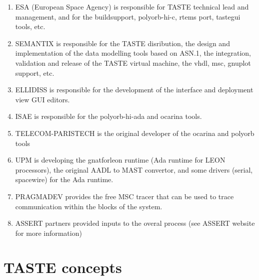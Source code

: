 \documentclass[11pt]{book}
\newcommand{\Concept}[1]{#1\xspace}
\newcommand{\taste}{\Concept{TASTE}}
\begin{document}
\begin{enumerate}
     \item
	ESA (European Space Agency) is responsible for TASTE technical lead and management, and for the buildsupport, polyorb-hi-c, rtems port, tastegui tools, etc.
    \item
	SEMANTIX is responsible for the TASTE disribution, the design and implementation of the data modelling tools based on ASN.1, the integration, validation and release of the TASTE virtual machine, the vhdl, msc, gnuplot support, etc.
    \item
	ELLIDISS is responsible for the development of the interface and deployment view GUI editors.
    \item
	ISAE is responsible for the polyorb-hi-ada and ocarina tools.
    \item
	TELECOM-PARISTECH is the original developer of the ocarina and polyorb tools
    \item
	UPM is developing the gnatforleon runtime (Ada runtime for LEON processors), the original AADL to MAST convertor, and some drivers (serial, spacewire) for the Ada runtime.
    \item
	PRAGMADEV provides the free MSC tracer that can be used to trace communication within the blocks of the system.
    \item
	ASSERT partners provided inputs to the overal process (see ASSERT website for more information)
\end{enumerate}


\chapter{\taste concepts}
\end{document}
